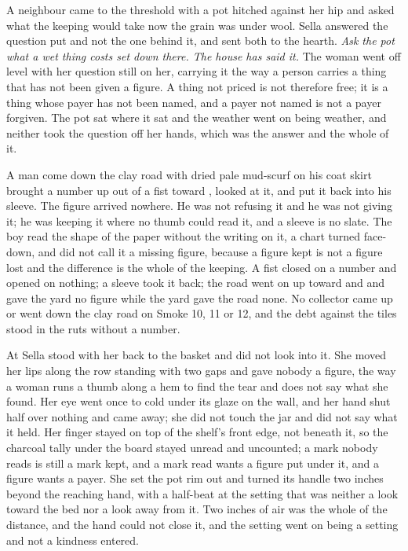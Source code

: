 \scenebreak

A neighbour came to the threshold with a pot hitched against her hip and asked what the keeping would take now the grain was under wool. Sella answered the question put and not the one behind it, and sent both to the hearth. \emph{Ask the pot what a wet thing costs set down there. The house has said it.} The woman went off level with her question still on her, carrying it the way a person carries a thing that has not been given a figure. A thing not priced is not therefore free; it is a thing whose payer has not been named, and a payer not named is not a payer forgiven. The pot sat where it sat and the weather went on being weather, and neither took the question off her hands, which was the answer and the whole of it.

A man come down the clay road with dried pale mud-scurf on his coat skirt brought a number up out of a fist toward , looked at it, and put it back into his sleeve. The figure arrived nowhere. He was not refusing it and he was not giving it; he was keeping it where no thumb could read it, and a sleeve is no slate. The boy read the shape of the paper without the writing on it, a chart turned face-down, and did not call it a missing figure, because a figure kept is not a figure lost and the difference is the whole of the keeping. A fist closed on a number and opened on nothing; a sleeve took it back; the road went on up toward  and  and gave the yard no figure while the yard gave the road none. No collector came up or went down the clay road on Smoke 10, 11 or 12, and the debt against the tiles stood in the ruts without a number.

At  Sella stood with her back to the basket and did not look into it. She moved her lips along the row standing with two gaps and gave nobody a figure, the way a woman runs a thumb along a hem to find the tear and does not say what she found. Her eye went once to  cold under its glaze on the wall, and her hand shut half over nothing and came away; she did not touch the jar and did not say what it held. Her finger stayed on top of the shelf's front edge, not beneath it, so the charcoal tally under the board stayed unread and uncounted; a mark nobody reads is still a mark kept, and a mark read wants a figure put under it, and a figure wants a payer. She set the pot rim out and turned its handle two inches beyond the reaching hand, with a half-beat at the setting that was neither a look toward the bed nor a look away from it. Two inches of air was the whole of the distance, and the hand could not close it, and the setting went on being a setting and not a kindness entered.

